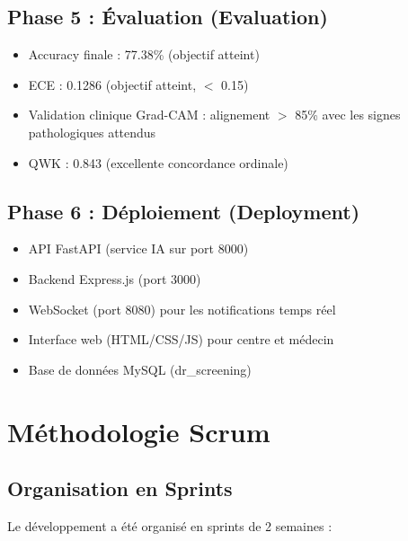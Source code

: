 \documentclass[12pt,a4paper,oneside]{report}
\begin{document}
\subsection{Phase 5 : Évaluation (Evaluation)}

\begin{itemize}
    \item Accuracy finale : 77.38\% (objectif atteint)
    \item ECE : 0.1286 (objectif atteint, $<$ 0.15)
    \item Validation clinique Grad-CAM : alignement $>$ 85\% avec
          les signes pathologiques attendus
    \item QWK : 0.843 (excellente concordance ordinale)
\end{itemize}

\subsection{Phase 6 : Déploiement (Deployment)}

\begin{itemize}
    \item API FastAPI (service IA sur port 8000)
    \item Backend Express.js (port 3000)
    \item WebSocket (port 8080) pour les notifications temps réel
    \item Interface web (HTML/CSS/JS) pour centre et médecin
    \item Base de données MySQL (dr\_screening)
\end{itemize}

\section{Méthodologie Scrum}

\subsection{Organisation en Sprints}

Le développement a été organisé en sprints de 2 semaines :
\end{document}
